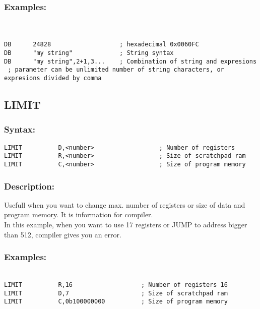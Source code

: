 {        \subsubsection{Examples:}\\
        {
            ~\\
            \usecodefont
            \verb'DB      24828                   ; hexadecimal 0x0060FC'\\
            \verb'DB      "my string"             ; String syntax'\\
            \verb'DB      "my string",2+1,3...    ; Combination of string and expresions'\\
            \verb' ; parameter can be unlimited number of string characters, or expresions divided by comma'\\
        }
    \subsection{LIMIT}
    
        \subsubsection{Syntax:}
        \verb'LIMIT          D,<number>                  ; Number of registers '\\
        \verb'LIMIT          R,<number>                  ; Size of scratchpad ram '\\
        \verb'LIMIT          C,<number>                  ; Size of program memory '\\
        
        \subsubsection{Description:}
        Usefull when you want to change max. number of registers or size of  data and program memory. It is information for compiler.\\
        In this example, when you want to use 17 registers or JUMP to address bigger than 512, compiler gives you an error.

        \subsubsection{Examples:}
        {
            ~\\
            \usecodefont            
            \verb'LIMIT          R,16                   ; Number of registers 16'\\
            \verb'LIMIT          D,7                    ; Size of scratchpad ram   '\\
            \verb'LIMIT          C,0b100000000          ; Size of program memory '\\
        }
        
}
